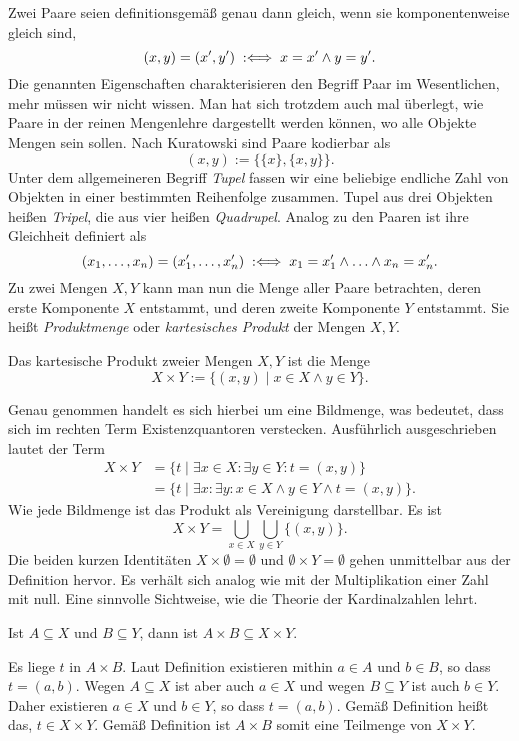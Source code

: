 Zwei Paare seien definitionsgemäß genau dann gleich, wenn sie
komponentenweise gleich sind,%
\[(x,y) = (x',y')\;:\Longleftrightarrow\; x=x'\land y=y'.\]
Die genannten Eigenschaften charakterisieren den Begriff Paar
im Wesentlichen, mehr müssen wir nicht wissen. Man hat sich trotzdem
auch mal überlegt, wie Paare in der reinen Mengenlehre dargestellt
werden können, wo alle Objekte Mengen sein sollen. Nach Kuratowski
sind Paare kodierbar als%
\[(x,y) := \{\{x\},\{x,y\}\}.\]
Unter dem allgemeineren Begriff \emph{Tupel} fassen
wir eine beliebige endliche Zahl von Objekten in einer bestimmten
Reihenfolge zusammen. Tupel aus drei Objekten heißen \emph{Tripel},
die aus vier heißen \emph{Quadrupel}. Analog zu den Paaren ist ihre
Gleichheit definiert als%
\[(x_1,\ldots,x_n) = (x_1',\ldots,x_n')
\;:\Longleftrightarrow\; x_1=x_1'\land\ldots\land x_n=x_n'.\]
Zu zwei Mengen $X,Y$ kann man nun die Menge aller Paare betrachten,
deren erste Komponente $X$ entstammt, und deren zweite
Komponente $Y$ entstammt. Sie heißt \emph{Produktmenge}
oder \emph{kartesisches Produkt}
der Mengen $X,Y$.
\begin{Definition}[Produktmenge]\newlinefirst
Das kartesische Produkt zweier Mengen $X,Y$ ist die Menge
\[X\times Y := \{(x,y)\mid x\in X\land y\in Y\}.\]
\end{Definition}
Genau genommen handelt es sich hierbei um eine Bildmenge, was bedeutet,
dass sich im rechten Term Existenzquantoren verstecken. Ausführlich
ausgeschrieben lautet der Term%
\begin{align*}
X\times Y &= \{t\mid\exists x\in X\colon\exists y\in Y\colon t=(x,y)\}\\
&= \{t\mid\exists x\colon\exists y\colon x\in X\land y\in Y\land t=(x,y)\}.
\end{align*}
Wie jede Bildmenge ist das Produkt als Vereinigung darstellbar. Es ist%
\[X\times Y = \bigcup_{x\in X}\bigcup_{y\in Y}\{(x,y)\}.\]
Die beiden kurzen Identitäten $X\times\emptyset = \emptyset$ und
$\emptyset\times Y = \emptyset$ gehen unmittelbar aus der Definition
hervor. Es verhält sich analog wie mit der Multiplikation einer
Zahl mit null. Eine sinnvolle Sichtweise, wie die Theorie der
Kardinalzahlen lehrt.

\begin{Satz}
Ist $A\subseteq X$ und $B\subseteq Y$, dann ist
$A\times B\subseteq X\times Y$.
\end{Satz}
\begin{Beweis}
Es liege $t$ in $A\times B$. Laut Definition existieren mithin
$a\in A$ und $b\in B$, so dass $t=(a,b)$. Wegen $A\subseteq X$ ist aber
auch $a\in X$ und wegen $B\subseteq Y$ ist auch $b\in Y$. Daher existieren
$a\in X$ und $b\in Y$, so dass $t=(a,b)$. Gemäß Definition heißt das,
$t\in X\times Y$. Gemäß Definition ist $A\times B$ somit eine Teilmenge
von $X\times Y$.\;\qedsymbol
\end{Beweis}

